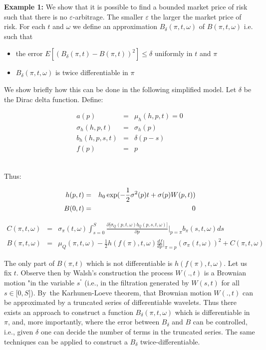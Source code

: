 \documentclass{article}
\begin{document}
\textbf{Example 1: }We show that it is possible to find a bounded market
price of risk such that there is no $\varepsilon $-arbitrage. The smaller $%
\varepsilon $ the larger the market price of risk. For each $t$ and $\omega $
we define an approximation $B_{\delta }(\pi ,t,\omega )$ of $B(\pi ,t,\omega
)$ i.e. such that

\begin{itemize}
\item the error $E[(B_{\delta }(\pi ,t)-B(\pi ,t))^{2}]\leq \delta $
uniformly in $t$ and $\pi $

\item $B_{\delta }(\pi ,t,\omega )$ is twice differentiable in $\pi $
\end{itemize}

We show briefly how this can be done in the following simplified model. Let $%
\delta $ be the Dirac delta function. Define:

\begin{eqnarray*}
a(p) &=&\mu _{h}(h,p,t)=0 \\
\sigma _{h}(h,p,t) &=&\sigma _{h}(p) \\
b_{h}(h,p,s,t) &=&\delta (p-s) \\
f(p) &=&p
\end{eqnarray*}%
\bigskip\ 

Thus:

\begin{eqnarray}
h(p,t) &=&h_{0}\exp (-\frac{1}{2}\sigma ^{2}(p)t+\sigma (p)W(p,t))
\label{h_of_p} \\
B(0,t) &=&0  \notag
\end{eqnarray}%
\bigskip

\begin{eqnarray*}
C(\pi ,t,\omega ) &=&\sigma _{\pi }(t,\omega )\int_{s=0}^{S}\frac{\partial
\lbrack \sigma _{Q}(p,t,\omega )b_{Q}(p,s,t,\omega )]}{\partial p}|_{p=\pi
}b_{\pi }(s,t,\omega )ds \\
B(\pi ,t,\omega ) &=&\mu _{Q}(\pi ,t,\omega )-\frac{1}{2}h(f(\pi ),t,\omega )%
\frac{df}{dp}|_{\pi =p}(\sigma _{\pi }(t,\omega ))^{2}+C(\pi ,t,\omega )
\end{eqnarray*}

The only part of $B(\pi ,t)$ which is not differentiable is $h(f(\pi
),t,\omega )$. Let us fix $t$. Observe then by Walsh's construction the
process $W(.,t)$ is a Brownian motion "in the variable $s^{\text{"}}$ (i.e.,
in the filtration generated by $W(s,t)$ for all $s\in \lbrack 0,S]$). By\
the Karhunen-Loeve theorem, that Brownian motion $W(.,t)$ can be
approximated by a truncated series of differentiable wavelets. Thus there
exists an approach to construct a function $B_{\delta }(\pi ,t,\omega )$
which is differentiable in $\pi $, and, more importantly, where the error
between $B_{\delta }$ and $B$ can be controlled, i.e., given $\delta $ one
can decide the number of terms in the truncated series. The same techniques
can be applied to construct a $B_{\delta }$ twice-differentiable.
\end{document}
